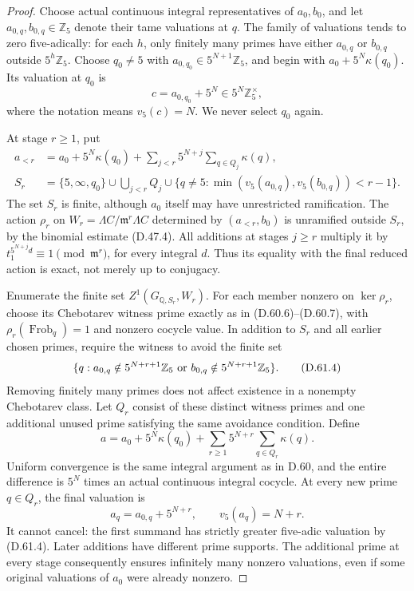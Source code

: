 \begin{proof}
Choose actual continuous integral representatives of \(a_0,b_0\),
and let \(a_{0,q},b_{0,q}\in\mathbb Z_5\) denote their tame valuations
at \(q\). The family of valuations tends to zero five-adically:
for each \(h\), only finitely many primes have
either \(a_{0,q}\) or \(b_{0,q}\) outside \(5^h\mathbb Z_5\).
Choose \(q_0\ne5\) with
\(a_{0,q_0}\in5^{N+1}\mathbb Z_5\), and begin with
\(a_0+5^N\kappa(q_0)\). Its valuation at \(q_0\) is
\[
                c=a_{0,q_0}+5^N
                   \in5^N\mathbb Z_5^\times,
                                                        \tag{D.61.2}
\]
where the notation means \(v_5(c)=N\).
We never select \(q_0\) again.

At stage \(r\ge1\), put
\[
 \begin{split}
 a_{<r}&=a_0+5^N\kappa(q_0)+
             \sum_{j<r}5^{N+j}\sum_{q\in Q_j}\kappa(q),\\
 S_r&=\{5,\infty,q_0\}\cup\bigcup_{j<r}Q_j
       \cup\{q\ne5:\min(v_5(a_{0,q}),v_5(b_{0,q}))<r-1\}.
 \end{split}                                           \tag{D.61.3}
\]
The set \(S_r\) is finite, although \(a_0\) itself may
have unrestricted ramification. The action \(\rho_r\)
on \(W_r=\Lambda C/\mathfrak m^r\Lambda C\) determined
by \((a_{<r},b_0)\) is unramified outside \(S_r\), by
the binomial estimate (D.47.4). All additions at stages
\(j\ge r\) multiply it by
\(t_1^{5^{N+j}d}\equiv1\pmod{\mathfrak m^r}\), for
every integral \(d\). Thus its equality with the final
reduced action is exact, not merely up to conjugacy.

Enumerate the finite set
\(Z^1(G_{\mathbb Q,S_r},W_r)\). For each member
nonzero on \(\ker\rho_r\), choose its Chebotarev
witness prime exactly as in (D.60.6)--(D.60.7), with
\(\rho_r(\operatorname{Frob}_q)=1\) and nonzero
cocycle value. In addition to \(S_r\) and all earlier
chosen primes, require the witness to avoid the finite set
\[
 \{q:a_{0,q}\notin5^{N+r+1}\mathbb Z_5
                  \ \hbox{or}\ b_{0,q}\notin5^{N+r+1}\mathbb Z_5\}.
                                                        \tag{D.61.4}
\]
Removing finitely many primes does not affect existence
in a nonempty Chebotarev class. Let \(Q_r\) consist of
these distinct witness primes and one additional unused
prime satisfying the same avoidance condition. Define
\[
 a=a_0+5^N\kappa(q_0)+
                  \sum_{r\ge1}5^{N+r}\sum_{q\in Q_r}\kappa(q).
                                                        \tag{D.61.5}
\]
Uniform convergence is the same integral argument as
in D.60, and the entire difference is \(5^N\) times
an actual continuous integral cocycle. At every new
prime \(q\in Q_r\), the final valuation is
\[
               a_q=a_{0,q}+5^{N+r},
                    \qquad v_5(a_q)=N+r.
                                                        \tag{D.61.6}
\]
It cannot cancel: the first summand has strictly greater
five-adic valuation by (D.61.4). Later additions have
different prime supports. The additional prime at every
stage consequently ensures infinitely many nonzero
valuations, even if some original valuations of \(a_0\)
were already nonzero.


\end{proof}
